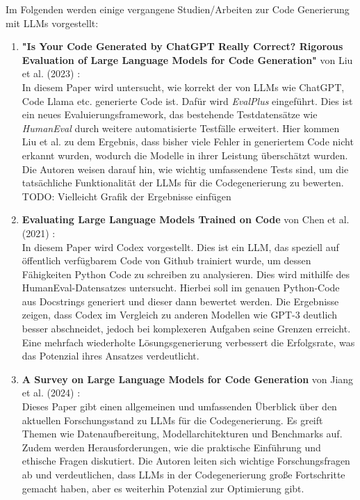 \documentclass[11pt,a4paper]{article}
\begin{document}
Im Folgenden werden einige vergangene Studien/Arbeiten zur Code Generierung mit LLMs vorgestellt:
\begin{enumerate}
    \item \textbf{"Is Your Code Generated by ChatGPT Really Correct? Rigorous Evaluation of Large Language Models for Code Generation"} von Liu et al. (2023) \cite{NEURIPS2023_43e9d647}:\\
    In diesem Paper wird untersucht, wie korrekt der von LLMs wie ChatGPT, Code Llama etc. generierte Code ist. Dafür wird \emph{EvalPlus} eingeführt. Dies ist ein neues Evaluierungsframework, das bestehende Testdatensätze wie \emph{HumanEval} durch weitere automatisierte Testfälle erweitert. Hier kommen Liu et al. zu dem Ergebnis, dass bisher viele Fehler in generiertem Code nicht erkannt wurden, wodurch die Modelle in ihrer Leistung überschätzt wurden. Die Autoren weisen darauf hin, wie wichtig umfassendene Tests sind, um die tatsächliche Funktionalität der LLMs für die Codegenerierung zu bewerten.
TODO: Vielleicht Grafik der Ergebnisse einfügen
    \item \textbf{Evaluating Large Language Models Trained on Code} von Chen et al. (2021) \cite{chen2021evaluatinglargelanguagemodels}:\\
    In diesem Paper wird Codex vorgestellt. Dies ist ein LLM, das speziell auf öffentlich verfügbarem Code von Github trainiert wurde, um dessen Fähigkeiten Python Code zu schreiben zu analysieren. Dies wird mithilfe des HumanEval-Datensatzes untersucht. Hierbei soll im genauen Python-Code aus Docstrings generiert und dieser dann bewertet werden. Die Ergebnisse zeigen, dass Codex im Vergleich zu anderen Modellen wie GPT-3 deutlich besser abschneidet, jedoch bei komplexeren Aufgaben seine Grenzen erreicht. Eine mehrfach wiederholte Lösungsgenerierung verbessert die Erfolgsrate, was das Potenzial ihres Ansatzes verdeutlicht.

    \item \textbf{A Survey on Large Language Models for Code Generation} von Jiang et al. (2024) \cite{jiang2024surveylargelanguagemodels}:\\
    Dieses Paper gibt einen allgemeinen und umfassenden Überblick über den aktuellen Forschungsstand zu LLMs für die Codegenerierung. Es greift Themen wie Datenaufbereitung, Modellarchitekturen und Benchmarks auf. Zudem werden Herausforderungen, wie die praktische Einführung und ethische Fragen diskutiert. Die Autoren leiten sich wichtige Forschungsfragen ab und verdeutlichen, dass LLMs in der Codegenerierung große Fortschritte gemacht haben, aber es weiterhin Potenzial zur Optimierung gibt.


\end{enumerate}
\end{document}
